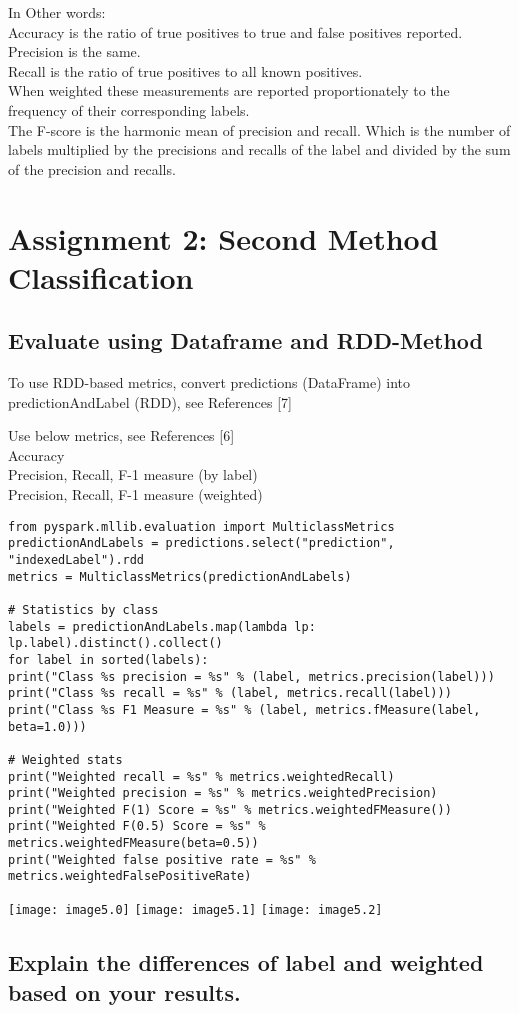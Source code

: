 \documentclass[]{article}
\begin{document}
In Other words:\\
Accuracy is the ratio of true positives to true and false positives reported. \\
Precision is the same. \\
Recall is the ratio of true positives to all known positives. \\
When weighted these measurements are reported proportionately to the frequency of their corresponding labels. \\
The F-score is the harmonic mean of precision and recall. Which is the number of labels multiplied by the precisions and recalls of the label and divided by the sum of the precision and recalls. \\

\section*{Assignment 2: Second Method Classification}

\subsection*{Evaluate using Dataframe and RDD-Method}
To use RDD-based metrics, convert predictions (DataFrame) into predictionAndLabel (RDD), see References [7]

Use below metrics, see References [6] \\
	Accuracy \\
	Precision, Recall, F-1 measure (by label) \\
	Precision, Recall, F-1 measure (weighted) \\
	
\begin{verbatim}
from pyspark.mllib.evaluation import MulticlassMetrics
predictionAndLabels = predictions.select("prediction", "indexedLabel").rdd
metrics = MulticlassMetrics(predictionAndLabels)

# Statistics by class
labels = predictionAndLabels.map(lambda lp: lp.label).distinct().collect()
for label in sorted(labels):
print("Class %s precision = %s" % (label, metrics.precision(label)))
print("Class %s recall = %s" % (label, metrics.recall(label)))
print("Class %s F1 Measure = %s" % (label, metrics.fMeasure(label, beta=1.0)))

# Weighted stats
print("Weighted recall = %s" % metrics.weightedRecall)
print("Weighted precision = %s" % metrics.weightedPrecision)
print("Weighted F(1) Score = %s" % metrics.weightedFMeasure())
print("Weighted F(0.5) Score = %s" % metrics.weightedFMeasure(beta=0.5))
print("Weighted false positive rate = %s" % metrics.weightedFalsePositiveRate)
\end{verbatim}
\texttt{[image: image5.0]}
\texttt{[image: image5.1]}
\texttt{[image: image5.2]}

\subsection*{Explain the differences of label and weighted based on your results.}
\end{document}
